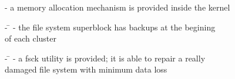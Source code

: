 \begin{slide}{}
{\hspace{1cm} - a memory allocation mechanism is provided inside the kernel

\begin{tabbing}
\hspace{1cm} - \= \kill
\hspace{1cm} - the file system superblock has backups at the begining\\
\> of each cluster
\end{tabbing}

\begin{tabbing}
\hspace{1cm} - \= \kill
\hspace{1cm} - a fsck utility is provided; it is able to repair a really\\
\> damaged file system with minimum data loss
\end{tabbing}

}

\end{slide}
